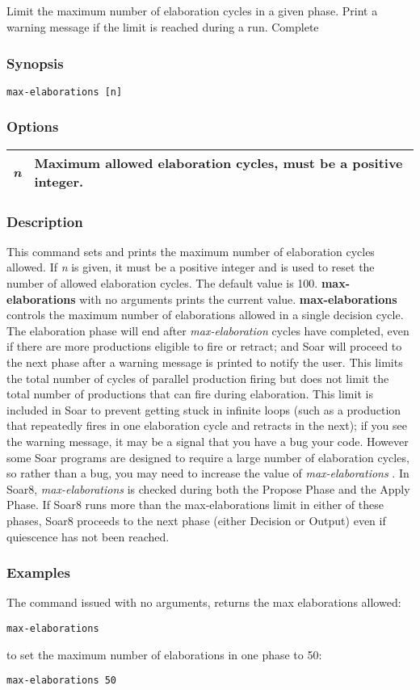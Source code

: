 \subsection{}
\label{max-elaborations}
Limit the maximum number of elaboration cycles in a given phase. Print a warning message if the limit is reached during a run. 
 Complete
\subsubsection*{Synopsis}
\begin{verbatim}
max-elaborations [n]
\end{verbatim}
\subsubsection*{Options}
\begin{tabular}{|l|l|}
\hline 
\emph{n}
 & Maximum allowed elaboration cycles, must be a positive integer.  \\
 \hline 
\end{tabular}
\subsubsection*{Description}
 This command sets and prints the maximum number of elaboration cycles allowed. If \emph{n}
 is given, it must be a positive integer and is used to reset the number of allowed elaboration cycles. The default value is 100. \textbf{max-elaborations}
 with no arguments prints the current value. 
 \textbf{max-elaborations}
 controls the maximum number of elaborations allowed in a single decision cycle. The elaboration phase will end after \emph{max-elaboration}
 cycles have completed, even if there are more productions eligible to fire or retract; and Soar will proceed to the next phase after a warning message is printed to notify the user. This limits the total number of cycles of parallel production firing but does not limit the total number of productions that can fire during elaboration. 
 This limit is included in Soar to prevent getting stuck in infinite loops (such as a production that repeatedly fires in one elaboration cycle and retracts in the next); if you see the warning message, it may be a signal that you have a bug your code. However some Soar programs are designed to require a large number of elaboration cycles, so rather than a bug, you may need to increase the value of \emph{max-elaborations}
. 
 In Soar8, \emph{max-elaborations}
 is checked during both the Propose Phase and the Apply Phase. If Soar8 runs more than the max-elaborations limit in either of these phases, Soar8 proceeds to the next phase (either Decision or Output) even if quiescence has not been reached. 
\subsubsection*{Examples}
 The command issued with no arguments, returns the max elaborations allowed: \begin{verbatim}
max-elaborations 
\end{verbatim}
 to set the maximum number of elaborations in one phase to 50: \begin{verbatim}
max-elaborations 50
\end{verbatim}
